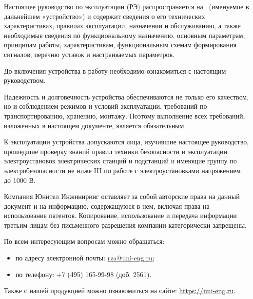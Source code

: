 \par
Настоящее руководство по эксплуатации (РЭ) распространяется на \device~(именуемое в дальнейшем «устройство») и содержит сведения о его технических характеристиках, правилах эксплуатации, назначении и обслуживанию, а также необходимые сведения по функциональному назначению, основным параметрам, принципам работы, характеристикам, функциональным схемам формирования сигналов, перечню уставок и настраиваемых параметров.
\medskip
\par
До включения устройства в работу необходимо ознакомиться с настоящим руководством.
\medskip
\par
Надежность и долговечность устройства обеспечиваются не только его качеством, но и соблюдением режимов и условий эксплуатации, требований по транспортированию, хранению, монтажу. Поэтому выполнение всех требований, изложенных в настоящем документе, является обязательным. 
\medskip
\par
К эксплуатации устройства допускаются лица, изучившие настоящее руководство, прошедшие проверку знаний правил техники безопасности и эксплуатации электроустановок электрических станций и подстанций и имеющие группу по электробезопасности не ниже III по работе с электроустановками напряжением до 1000 В.

\vskip 75mm
\par
Компания Юнител Инжиниринг оставляет за собой авторские права на данный документ и на информацию, содержащуюся в нем, включая права на использование патентов. Копирование, использование и передача информации третьим лицам без письменного разрешения компании категорически запрещены.

\vskip 10mm
\par
По всем интересующим вопросам можно обращаться:
\begin{itemize}
\item по адресу электронной почты: \href{mailto:rza@uni-eng.ru}{\color{unimain}\uline{rza@uni-eng.ru}};
\item по телефону: +7 (495) 165-99-98 (доб. 2561).
\end{itemize}
Также с нашей продукцией можно ознакомиться на сайте: \href{https://uni-eng.ru}{\color{unimain}\uline{https://uni-eng.ru}}.